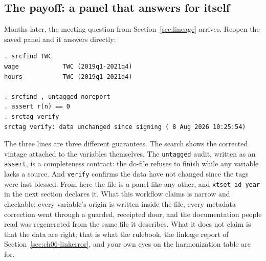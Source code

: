 \documentclass[
    a4paper,
    fontsize=10pt,
    twoside=true,
    numbers=noenddot,
]{kaobook}
\begin{document}
\subsection{The payoff: a panel that answers for itself}
Months later, the meeting question from Section~\ref{sec:lineage} arrives. Reopen the saved panel and it answers directly:
\par
{\footnotesize
\begin{verbatim}
. srcfind TWC
wage            TWC (2019q1-2021q4)
hours           TWC (2019q1-2021q4)

. srcfind , untagged noreport
. assert r(n) == 0
. srctag verify
srctag verify: data unchanged since signing ( 8 Aug 2026 10:25:54)
\end{verbatim}
}
The three lines are three different guarantees. The search shows the corrected vintage attached to the variables themselves. The \texttt{untagged} audit, written as an \texttt{assert}, is a completeness contract: the do-file refuses to finish while any variable lacks a source. And \texttt{verify} confirms the data have not changed since the tags were last blessed. From here the file is a panel like any other, and \texttt{xtset id year} in the next section declares it. What this workflow claims is narrow and checkable: every variable's origin is written inside the file, every metadata correction went through a guarded, receipted door, and the documentation people read was regenerated from the same file it describes. What it does not claim is that the data are right; that is what the rulebook, the linkage report of Section~\ref{sec:ch06-linkerror}, and your own eyes on the harmonization table are for.
\end{document}
